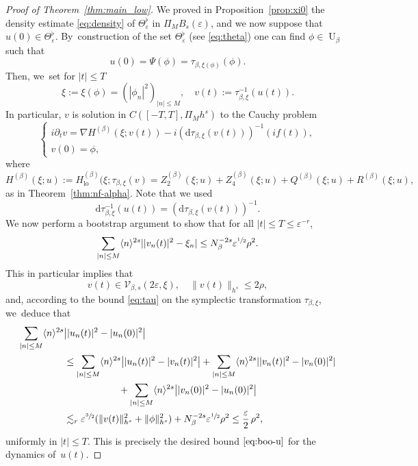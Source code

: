 \documentclass[JEP,XML,SOM,Unicode,published]{cedram}
\theoremstyle{plain}
\theoremstyle{definition}
\DeclareMathOperator{\lo}{lo}
\newcommand{\1}{\mathbf{1}}
\let\epsilon\varepsilon
\begin{document}
\begin{proof}[Proof of Theorem~\ref{thm:main_low}]
We proved in Proposition~\ref{prop:xi0} the density estimate \eqref{eq:density} of $\Theta_{\epsilon}^{\flat}$ in $\Pi_{M}B_{s}(\epsilon)$, and we now suppose that $u(0)\in\Theta_{\epsilon}^{\flat}$. By~construction of the set $\Theta_{\epsilon}^{\flat}$ (see \eqref{eq:theta}) one can find $\phi\in\operatorname{U}_{\beta}$ such that
\[
u(0) = \Psi(\phi) = \tau_{\beta,\xi(\phi)}(\phi).
\]
Then, we~set for $|t|\leq T$
\[
\xi:=\xi(\phi)=(|\phi_{n}|^{2})_{|n|\leq M},\quad v(t) := \tau_{\beta,\xi}^{-1}(u(t)).
\]
In particular, $v$ is solution in $C([-T,T],\Pi_{M}h^{s})$ to the Cauchy problem
\begin{equation}
\label{eq:cau-v}
\begin{cases}
i\partial_{t}v = \nabla H^{(\beta)}(\xi;v(t)) - i(\mathrm{d}\tau_{\beta,\xi}(v(t)))^{-1}(if(t)),\\
v(0) = \phi,
\end{cases}
\end{equation}
where
\[
H^{(\beta)}(\xi;u) := H_{\lo}^{(\beta)}(\xi;\tau_{\beta,\xi}(v) = Z_{2}^{(\beta)}(\xi;u)+Z_{4}^{(\beta)}(\xi;u)+Q^{(\beta)}(\xi;u)+R^{(\beta)}(\xi;u),
\]
as in Theorem~\ref{thm:nf-alpha}. Note that we used
\[
\mathrm{d}\tau_{\beta,\xi}^{-1}(u(t)) = (\mathrm{d}\tau_{\beta,\xi}(v(t)))^{-1}.
\]
We now perform a bootstrap argument to show that for all $|t|\leq T\leq \epsilon^{-r}$,
\begin{equation}
\label{eq:boo-v}
\sum_{|n|\leq M}\langle n\rangle^{2s}||v_{n}(t)|^{2} - \xi_{n}| \leq N_{\beta}^{-2s}\epsilon^{\sfrac{1}{2}}\rho^{2}.
\end{equation}
This in particular implies that
\begin{equation}
\label{eq:boo-v-c}
v(t)\in\mathcal{V}_{\beta,s}(2\epsilon,\xi),\quad \|v(t)\|_{h^{s}}\leq 2\rho,
\end{equation}
and, according to the bound \eqref{eq:tau} on the symplectic transformation $\tau_{\beta,\xi}$, we~deduce that
\begin{align*}
\sum_{|n|\leq M}\langle n\rangle^{2s}&\bigl||u_{n}(t)|^{2} - |u_{n}(0)|^{2}\bigr| \\
&\leq
\sum_{|n|\leq M}\langle n\rangle^{2s}\bigl||u_{n}(t)|^{2} - |v_{n}(t)|^{2}\bigr|+ \sum_{|n|\leq M}\langle n\rangle^{2s}||v_{n}(t)|^{2} - |v_{n}(0)|^{2}| \\
&\hspace*{2cm}+
\sum_{|n|\leq M}\langle n\rangle^{2s}\bigl||v_{n}(0)|^{2} - |u_{n}(0)|^{2}\bigr| \\
&\lesssim_{r}
\epsilon^{\sfrac{3}{2}}(\|v(t)\|_{h^{s}}^{2}+\|\phi\|_{h^{s}}^{2}) + N_{\beta}^{-2s}\epsilon^{\sfrac{1}{2}}\rho^{2} \leq \frac{\epsilon}{2}\,\rho^{2},
\end{align*}
uniformly in $|t|\leq T$. This is precisely the desired bound $\eqref{eq:boo-u}$ for the dynamics of~$u(t)$.


\end{proof}
\end{document}
